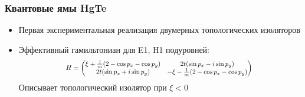 \documentclass{beamer}
\begin{document}
\begin{frame}
    \frametitle{Квантовые ямы HgTe}
    \begin{itemize}
        \item Первая экспериментальная реализация двумерных топологических изоляторов
    
        \item Эффективный гамильтониан для E1, H1 подуровней:
        \begin{equation}
           \label{eff_so_ham}
            \scalebox{0.8}{%
            $
            H = \left(\begin{matrix}
                    \xi + \frac{1}{m}(2 - \cos{p_x} - \cos{p_y}) & 
                            2t(\sin{p_x} - i\sin{p_y})   \\
                    2t(\sin{p_x} + i\sin{p_y}) & 
                           - \xi - \frac{1}{m}(2 - \cos{p_x} - \cos{p_y}) \\
                \end{matrix}\right)
            $
            }
        \end{equation}
        Описывает топологический изолятор при $\xi < 0$
    \end{itemize}
\end{frame}
\end{document}
